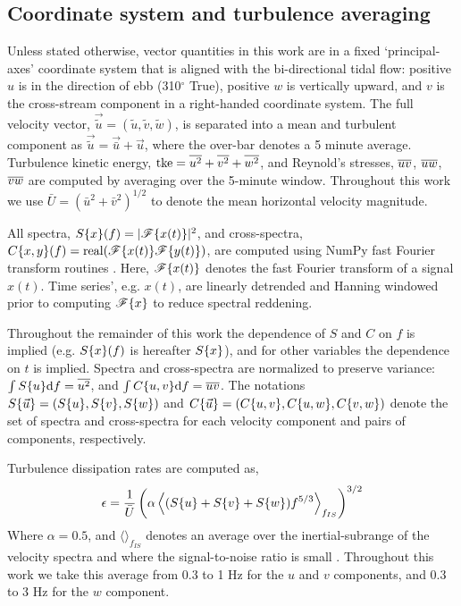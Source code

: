 \subsection{Coordinate system and turbulence averaging}

Unless stated otherwise, vector quantities in this work are in a fixed `principal-axes' coordinate system that is aligned with the bi-directional tidal flow: positive $u$ is in the direction of ebb (310$^\circ$ True), positive $w$ is vertically upward, and $v$ is the cross-stream component in a right-handed coordinate system. The full velocity vector, $\vec{\tilde{u}} = (\tilde{u}, \tilde{v}, \tilde{w})$, is separated into a mean and turbulent component as $\vec{\tilde{u}} = \vec{\bar{u}} + \vec{u}$, where the over-bar denotes a 5 minute average. Turbulence kinetic energy, $\mathrm{tke} = \overline{u^2} + \overline{v^2}+\overline{w^2}$, and Reynold's stresses, $\overline{uv}$, $\overline{uw}$, $\overline{vw}$ are computed by averaging over the 5-minute window.  Throughout this work we use $\bar{U} = (\bar{u}^2+\bar{v}^2)^{1/2}$ to denote the mean horizontal velocity magnitude. 

All spectra, $S\{x\}(f)=|\mathscr{F}\{x(t)\}|^2$, and cross-spectra, $C\{x,y\}(f)=\mathrm{real}(\mathscr{F}\{x(t)\}\mathscr{F}\{y(t)\})$, are computed using NumPy fast Fourier transform routines \cite[]{Walt++2011}. Here, $\mathscr{F}\{x(t)\}$ denotes the fast Fourier transform of a signal $x(t)$. Time series', e.g. $x(t)$, are linearly detrended and Hanning windowed prior to computing $\mathscr{F}\{x\}$ to reduce spectral reddening.  

Throughout the remainder of this work the dependence of $S$ and $C$ on $f$ is implied (e.g. $S\{x\}(f)$ is hereafter $S\{x\}$), and for other variables the dependence on $t$ is implied. Spectra and cross-spectra are normalized to preserve variance: $\int S\{u\}\mathrm{d}f = \overline{u^2}$, and  $\int C\{u,v\}\mathrm{d}f = \overline{uv}$. The notations $S\{\vec{u}\}=(S\{u\}, S\{v\}, S\{w\})$ and $C\{\vec{u}\} = (C\{u,v\}, C\{u,w\}, C\{v,w\} )$ denote the set of spectra and cross-spectra for each velocity component and pairs of components, respectively.

Turbulence dissipation rates are computed as,
\begin{align}
  \epsilon = \frac{1}{\bar{U}}\left(\alpha\left\langle(S\{u\}+S\{v\}+S\{w\})f^{5/3}\right\rangle_{f_{IS}}\right)^{3/2}
\end{align}
Where  $\alpha=0.5$, and $\langle\rangle_{f_{IS}}$ denotes an average over the inertial-subrange of the velocity spectra and where the signal-to-noise ratio is small \cite[]{Lumley+Terray1983,Sreenivasan1995}. Throughout this work we take this average from 0.3 to 1 Hz for the $u$ and $v$ components, and 0.3 to 3 Hz for the $w$ component.


